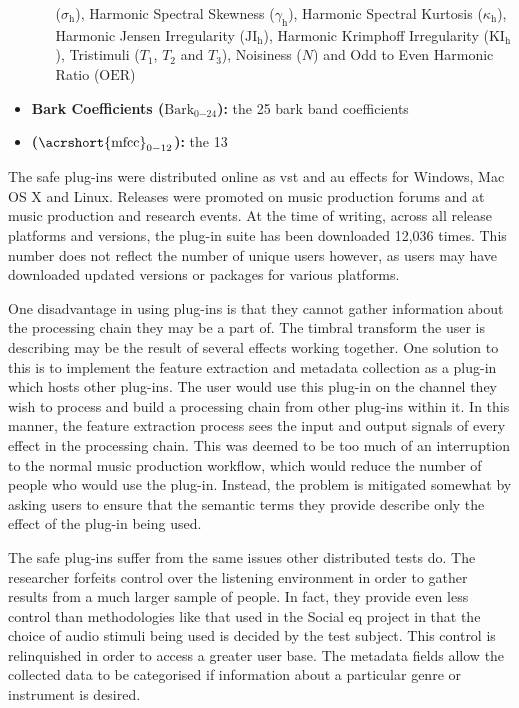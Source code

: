 \begin{itemize}
\begin{itemize}
				      ($\sigma_{\mathrm{h}}$), Harmonic Spectral Skewness ($\gamma_{\mathrm{h}}$), Harmonic
				      Spectral Kurtosis ($\kappa_{\mathrm{h}}$), Harmonic Jensen Irregularity
				      ($\mathrm{JI_{h}}$), Harmonic Krimphoff Irregularity
				      ($\mathrm{KI_{h}}$), Tristimuli ($T_{1}$, $T_{2}$ and $T_{3}$), Noisiness
				      ($N$) and Odd to Even Harmonic Ratio ($\mathrm{OER}$)
			\end{itemize}
			\item {\bf{Bark Coefficients (}}$\mathrm{Bark}_{0\mathrm{-}24}${\bf{):}} the 25 bark band
			      coefficients
		      \item {\bf{ (}}$\mathrm{\acrshort{mfcc}}_{0\mathrm{-}12}${\bf{):}} the 13 
		\end{itemize}

		The \acrshort{safe} plug-ins were distributed online as \acrshort{vst} and \acrshort{au} effects for
		Windows, Mac OS X and Linux.  Releases were promoted on music production forums and at music production and
		research events. At the time of writing, across all release platforms and versions, the plug-in suite has
		been downloaded 12,036 times. This number does not reflect the number of unique users however, as users may
		have downloaded updated versions or packages for various platforms.

		One disadvantage in using plug-ins is that they cannot gather information about the processing chain they
		may be a part of. The timbral transform the user is describing may be the result of several effects
		working together. One solution to this is to implement the feature extraction and metadata collection as a
		plug-in which hosts other plug-ins. The user would use this plug-in on the channel they wish to process
		and build a processing chain from other plug-ins within it. In this manner, the feature extraction process
		sees the input and output signals of every effect in the processing chain. This was deemed to be too much
		of an interruption to the normal music production workflow, which would reduce the number of people who
		would use the plug-in. Instead, the problem is mitigated somewhat by asking users to ensure that the
		semantic terms they provide describe only the effect of the plug-in being used.

		The \acrshort{safe} plug-ins suffer from the same issues other distributed tests do. The researcher
		forfeits control over the listening environment in order to gather results from a much larger sample of
		people. In fact, they provide even less control than methodologies like that used in the Social
		\acrshort{eq} project \citep{cartwright2013socialeq} in that the choice of audio stimuli being used is
		decided by the test subject. This control is relinquished in order to access a greater user base. The
		metadata fields allow the collected data to be categorised if information about a particular genre or
		instrument is desired.

